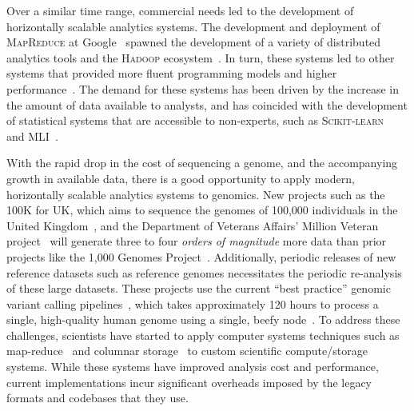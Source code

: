 \documentclass[11pt]{article} %
\begin{document}
Over a similar time range, commercial needs led to the development of horizontally scalable
analytics systems. The development and deployment of \textsc{MapReduce} at
Google~\cite{dean04, dean08} spawned the development of a variety of distributed analytics tools
and the \textsc{Hadoop} ecosystem~\cite{hadoop}. In turn, these systems led to other systems
that provided more fluent programming models and higher performance~\cite{zaharia10}.
The demand for these systems has been driven by the increase in the amount of data available to
analysts, and has coincided with the development of statistical systems that are accessible to
non-experts, such as \textsc{Scikit-learn}~\cite{pedregosa11} and \textsc{MLI}~\cite{sparks13}.

With the rapid drop in the cost of sequencing a genome, and the accompanying growth in available data,
there is a good opportunity to apply modern, horizontally scalable analytics systems to genomics. New
projects such as the 100K for UK, which aims to sequence the genomes of 100,000 individuals in the
United Kingdom~\cite{uk100k}, and the Department of Veterans Affairs' Million Veteran project~\cite{mvp}
will generate three to four \emph{orders of magnitude} more data than prior projects like the 1,000
Genomes Project~\cite{siva08}. Additionally, periodic releases of new reference datasets such as reference
genomes necessitates the periodic re-analysis of these large datasets. These projects use the current ``best
practice'' genomic variant calling pipelines~\cite{auwera13}, which takes approximately 120 hours to
process a single, high-quality human genome using a single, beefy node~\cite{talwalkar14}. To address
these challenges, scientists have started to apply computer systems techniques such as
map-reduce~\cite{langmead09, mckenna10, schatz09} and columnar storage~\cite{fritz11} to custom
scientific compute/storage systems. While these systems have improved analysis cost and performance,
current implementations incur significant overheads imposed by the legacy formats and codebases that
they use.
\end{document}
